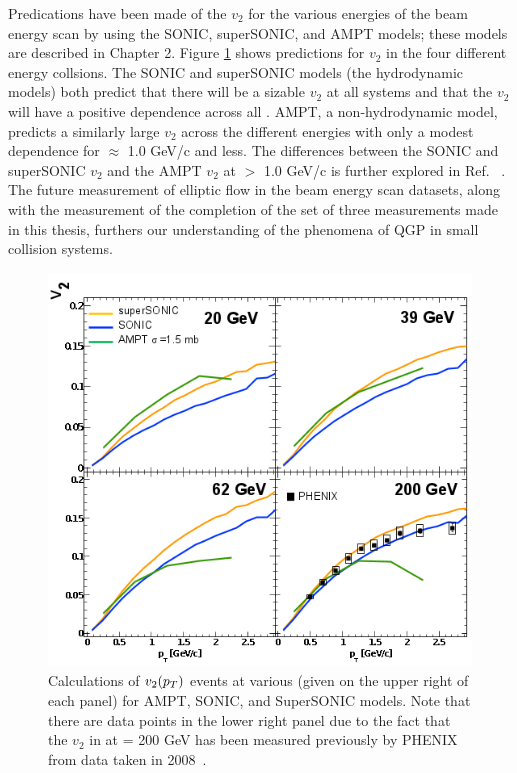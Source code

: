 Predications have been made of the $v_2$ for the various energies of the \dau beam energy scan by using the SONIC, superSONIC, and AMPT models; these models are described in Chapter 2. Figure \ref{fig:dau_bes_predictions} shows predictions for $v_2$ in the four different energy collsions. The SONIC and superSONIC models (the hydrodynamic models) both predict that there will be a sizable $v_2$ at all \sqsn systems and that the $v_2$ will have a positive \sqsn dependence across all \pt. AMPT, a non-hydrodynamic model, predicts a similarly large $v_2$ across the different energies with only a modest \sqsn dependence for \pt $\approx$ 1.0 GeV/c and less. The differences between the SONIC and superSONIC $v_2$ and the AMPT $v_2$ at \pt $>$ 1.0 GeV/c is further explored in Ref. ~\cite{PhysRevC.93.044910}. The future measurement of elliptic flow in the \dau beam energy scan datasets, along with the measurement of the completion of the set of three measurements made in this thesis, furthers our understanding of the phenomena of QGP in small collision systems.

\begin{figure}[!ht]
\begin{center}
\includegraphics[width=0.75\linewidth]{figs/dau_bescan_theory.png}
\caption{Calculations of $v_2(\mbox{$p_T$})$ \dau events at various \sqsn (given on the upper right of each panel) for AMPT, SONIC, and SuperSONIC models. Note that there are data points in the lower right panel due to the fact that the $v_2$ in \dau at \sqsn = 200 GeV has been measured previously by PHENIX from data taken in 2008~\cite{PhysRevC.93.044910}.}
\label{fig:dau_bes_predictions}
\end{center}
\end{figure}
